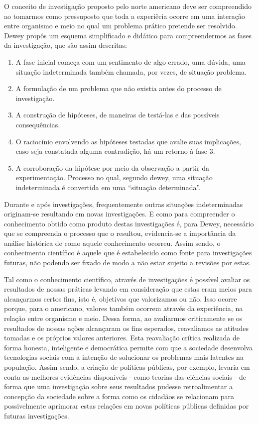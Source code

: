 \documentclass[12pt]{report}
\begin{document}
		O conceito de investigação proposto pelo norte americano deve ser compreendido ao tomarmos como pressuposto que toda a experiêcia ocorre em uma interação entre organismo e meio no qual um problema prático pretende ser resolvido. Dewey propôs um esquema simplificado e didático para compreendermos as fases da investigação, que são assim descritas:
	
			\begin{enumerate}
				\singlespacing
				\item A fase inicial começa com um sentimento de algo errado, uma dúvida, uma situação indeterminada também chamada, por vezes, de situação problema.
				\item A formulação de um problema que não existia antes do processo de investigação.
				\item A construção de hipóteses, de maneiras de testá-las e das possíveis consequências.
				\item O raciocínio envolvendo as hipóteses testadas que avalie suas implicações, caso seja constatada alguma contradição, há um retorno à fase 3.
				\item A corroboração da hipótese por meio da observação a partir da experimentação. Processo no qual, segundo dewey, uma situação indeterminada é convertida em uma “situação determinada”.
		\end{enumerate}
	
		\onehalfspacing 
		Durante e após investigações, frequentemente outras situações indeterminadas originam-se resultando em novas investigações. E como para compreender o conhecimento obtido como produto destas investigações é, para Dewey, necessário que se compreenda o processo que o resultou, evidencia-se a importância da análise histórica de como aquele conhecimento ocorreu. Assim sendo, o conhecimento científico é aquele que é estabelecido como fonte para investigações futuras, não podendo ser fixado de modo a não estar sujeito a revisões por estas.
		
		Tal como o conhecimento científico, através de investigações é possível avaliar os resultados de nossas práticas levando em consideração que estas eram meios para alcançarmos certos fins, isto é, objetivos que valorizamos ou não. Isso ocorre porque, para o americano, valores também ocorrem através da experiência, na relação entre organismo e meio. Dessa forma, ao avaliarmos criticamente se os resultados de nossas ações alcançaram os fins esperados, reavaliamos as atitudes tomadas e os próprios valores anteriores. Esta reavaliação crítica realizada de forma honesta, inteligente e democrática permite com que a sociedade desenvolva tecnologias sociais com a intenção de solucionar os problemas mais latentes na população. Assim sendo, a criação de políticas públicas, por exemplo, levaria em conta as melhores evidências disponíveis - como teorias das ciências sociais - de forma que uma investigação sobre seus resultados pudesse retroalimentar a concepção da sociedade sobre a forma como os cidadãos se relacionam para possivelmente aprimorar estas relações em novas políticas públicas definidas por futuras investigações.
		
\end{document}
